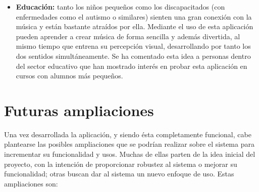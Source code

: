 \begin{itemize}
\item\textbf{Educación:} tanto los niños pequeños como los discapacitados (con enfermedades como el autismo o similares) sienten una gran conexión con la música y están bastante atraídos por ella. Mediante el uso de esta aplicación pueden aprender a crear música de forma sencilla y además divertida, al mismo tiempo que entrena su percepción visual, desarrollando por tanto los dos sentidos simultáneamente. Se ha comentado esta idea a personas dentro del sector educativo que han mostrado interés en probar esta aplicación en cursos con alumnos más pequeños.

\end{itemize}

\section{Futuras ampliaciones}
\label{sec:ampliaciones}

Una vez desarrollada la aplicación, y siendo ésta completamente funcional, cabe plantearse las posibles ampliaciones que se podrían realizar sobre el sistema para incrementar su funcionalidad y usos. Muchas de ellas parten de la idea inicial del proyecto, con la intención de proporcionar robustez al sistema o mejorar su funcionalidad; otras buscan dar al sistema un nuevo enfoque de uso. Estas ampliaciones son:

